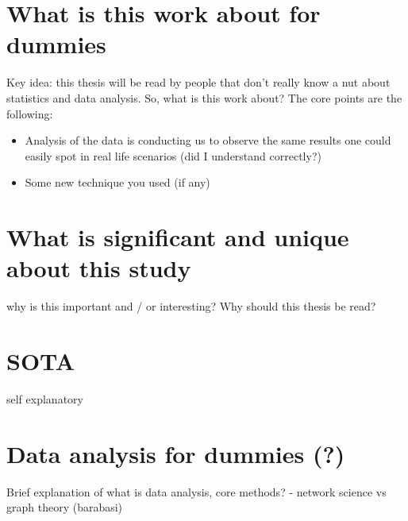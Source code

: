
\section{What is this work about for dummies}
Key idea: this thesis will be read by people that don't really know a nut about statistics and data analysis. 
So, what is this work about? 
The core points are the following:
\begin{itemize}
    \item Analysis of the data is conducting us to observe the same results one could easily spot in real life scenarios (did I understand correctly?)
    \item Some new technique you used (if any)
\end{itemize}
\section{What is significant and unique about this study}
why is this important and / or interesting? Why should this thesis be read?
\section{SOTA}
self explanatory
\section{Data analysis for dummies (?)}
Brief explanation of what is data analysis, core methods?
- network science vs graph theory (barabasi)
